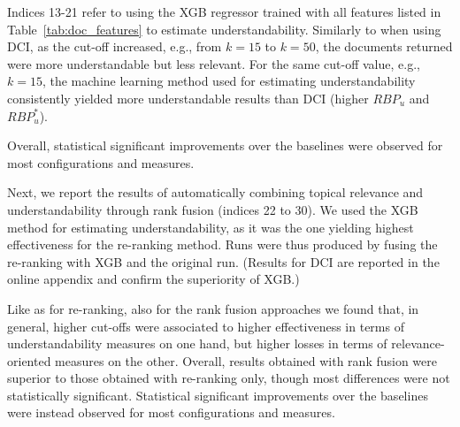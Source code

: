 Indices 13-21 refer to using the XGB regressor trained with all features listed in Table~\ref{tab:doc_features} to estimate understandability. Similarly to when using DCI, as the cut-off increased, e.g., from $k=15$ to $k=50$, the documents returned were more understandable but less relevant. For the same cut-off value, e.g., $k=15$, the machine learning method used for estimating understandability consistently yielded more understandable results than DCI (higher $RBP_u$ and $RBP_u^*$). 

Overall, statistical significant improvements over the baselines were observed for most configurations and measures.  


Next, we report the results of automatically combining topical relevance and understandability through rank fusion (indices 22 to 30). We used the XGB method for estimating understandability, as it was the one yielding highest effectiveness for the re-ranking method. Runs were thus produced by fusing the re-ranking with XGB and the original run. (Results for DCI are reported in the online appendix and confirm the superiority of XGB.) 

Like as for re-ranking, also for the rank fusion approaches we found that, in general, higher cut-offs were associated to higher effectiveness in terms of understandability measures on one hand, but higher losses in terms of relevance-oriented measures on the other. Overall, results obtained with rank fusion were superior to those obtained with re-ranking only, though most differences were not statistically significant. Statistical significant improvements over the baselines were instead observed for most configurations and measures.  


